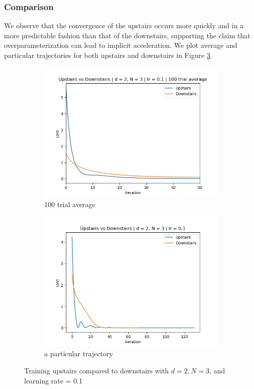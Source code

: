 \documentclass[11pt]{article}
\begin{document}
\subsubsection{Comparison}
We observe that the convergence of the upstairs occurs more quickly and in a more predictable fashion than that of the downstairs, supporting the claim that overparameterization can lead to implicit acceleration. We plot average and particular trajectories for both upstairs and downstairs in Figure \ref{fig:upstairs_downstairs}.
\begin{figure}[ht]
    \begin{subfigure}{0.5\textwidth}
        \centering
        \includegraphics[width=\textwidth]{images/upstairs_downstairs_avg.png}
        \caption{100 trial average}
        \label{fig:upstairs_downstairs_avg}
    \end{subfigure}
    \begin{subfigure}{0.5\textwidth}
        \centering
        \includegraphics[width=\textwidth]{images/upstairs_downstairs_1.png}
        \caption{a particular trajectory}
        \label{fig:upstairs_downstairs_1}
    \end{subfigure}
    \caption{Training upstairs compared to downstairs with $d = 2, N = 3$, and learning rate = 0.1}
    \label{fig:upstairs_downstairs}
\end{figure}


\pagebreak



\end{document}
